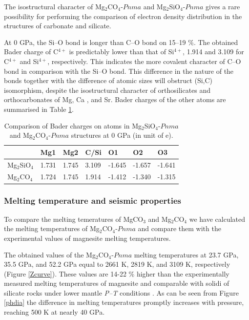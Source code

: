\documentclass[a4paperm]{article}
\begin{document}
{\color{blue}
The isostructural character of Mg$_2$CO$_4$-$Pnma$ and Mg$_2$SiO$_4$-$Pnma$ gives a rare possibility for performing the comparison of electron density distribution in the structures of carbonate and silicate.

At 0 GPa, the Si--O bond is longer than C--O bond on 15--19 \%.
The obtained Bader charge of C$^{4+}$ is predictably lower than that of Si$^{4+}$, 1.914 and 3.109 for C$^{4+}$ and Si$^{4+}$, respectively. 
This indicates the more covalent character of C--O bond in comparison with the Si--O bond.
This difference in the nature of the bonds together with the difference of atomic sizes will obstruct (Si,C) isomorphism, despite the isostructural character of orthosilicates and orthocarbonates of Mg, Ca \cite{sagatova2020_ortho}, and Sr\cite{laniel2021_sr2co4}.
Bader charges of the other atoms are summarised in Table \ref{t:bader}.
}

\begin{table}[h] \centering
	\caption{
		{\color{blue}
		Comparison of Bader charges on atoms in Mg$_2$SiO$_4$-$Pnma$ and Mg$_2$CO$_4$-$Pnma$ structures at 0 GPa (in unit of e).
	}	
} \vspace{2mm} \label{t:bader}
	\begin{tabular}{l l l l l l l }
        &       Mg1     &       Mg2     &       C/Si    &       O1      &       O2      &       O3      \\
		\hline
Mg$_2$SiO$_4$ &       1.731   &       1.745   &       3.109   &       -1.645  &       -1.657  &       -1.641  \\
Mg$_2$CO$_4$  &       1.724   &       1.745   &       1.914   &       -1.412  &       -1.340  &       -1.315  \\
		\hline 


	\end{tabular}
\end{table}


\subsubsection*{Melting temperature and seismic properties}
To compare the melting temeratures of MgCO$_3$ and Mg$_2$CO$_4$ we have calculated the melting temperatures of Mg$_2$CO$_4$-$Pnma$ and compare them with the experimental values of magnesite melting temperatures.

The obtained values of the Mg$_2$CO$_4$-$Pnma$ melting temperatures at 23.7 GPa, 35.5 GPa, and 52.2 GPa equal to 2661 K, 2819 K, and 3109 K, respectively (Figure \ref{Zcurve}).
These values are 14-22 \% higher than the experimentally measured melting temperatures of magnesite and comparable with solidi of silicate rocks under lower mantle {\it P--T} conditions \cite{litasov2018_review}.
As can be seen from Figure \ref{phdia} the difference in melting temperatures promptly increases with pressure, reaching 500 K at nearly 40 GPa.
\end{document}
